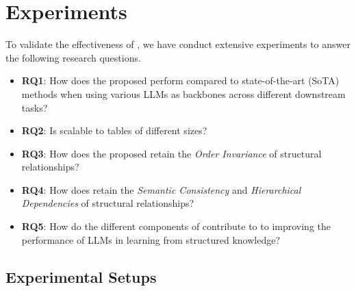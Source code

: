 \section{Experiments}
To validate the effectiveness of \name, we have conduct extensive experiments to answer the following research questions.
\begin{itemize}
    \item \textbf{RQ1}: 
    How does the proposed \name perform compared to state-of-the-art (SoTA) methods when using various LLMs as backbones across different downstream tasks?
    \item \textbf{RQ2}: Is \name scalable to tables of different sizes?
    \item \textbf{RQ3}: How does the proposed \name retain the \textit{Order Invariance} of structural relationships?
    \item \textbf{RQ4}: How does \name retain the \textit{Semantic Consistency} and \textit{Hierarchical Dependencies} of structural relationships?
    \item \textbf{RQ5}: How do the different components of \name contribute to to improving the performance of LLMs in learning from structured knowledge?

\end{itemize}
\subsection{Experimental Setups}
